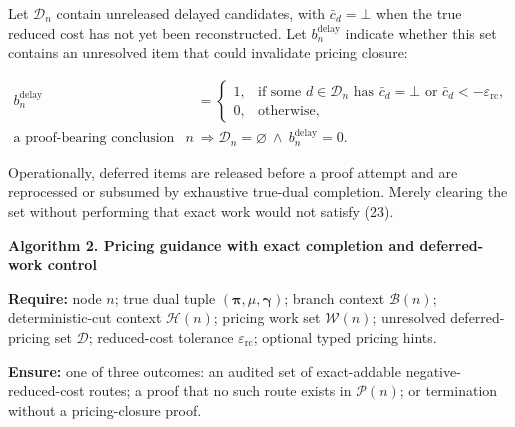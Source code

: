 \documentclass[
  11pt,
]{article}
\begin{document}
Let \(\mathcal{D}_n\) contain unreleased delayed candidates, with
\(\bar c_d=\bot\) when the true reduced cost has not yet been
reconstructed. Let \(b_n^{\mathrm{delay}}\) indicate whether this set
contains an unresolved item that could invalidate pricing closure:

\[
\begin{aligned}
b_n^{\mathrm{delay}}
&=
\begin{cases}
1, &
\text{if some }d\in\mathcal{D}_n
\text{ has }\bar c_d=\bot
\text{ or }\bar c_d<-\varepsilon_{\mathrm{rc}},\\
0, & \text{otherwise},
\end{cases}\\[2mm]
\text{a proof-bearing conclusion at node }n
&\Rightarrow
\mathcal{D}_n=\varnothing
\ \land\
b_n^{\mathrm{delay}}=0.
\end{aligned}
\tag{23}
\]

Operationally, deferred items are released before a proof attempt and
are reprocessed or subsumed by exhaustive true-dual completion. Merely
clearing the set without performing that exact work would not satisfy
(23).

\textbf{Algorithm 2. Pricing guidance with exact completion and
deferred-work control}

\textbf{Require:} node \(n\); true dual tuple
\((\boldsymbol{\pi},\mu,\boldsymbol{\gamma})\); branch context
\(\mathcal{B}(n)\); deterministic-cut context \(\mathcal{H}(n)\);
pricing work set \(\mathcal{W}(n)\); unresolved deferred-pricing set
\(\mathcal{D}\); reduced-cost tolerance \(\varepsilon_{\mathrm{rc}}\);
optional typed pricing hints.

\textbf{Ensure:} one of three outcomes: an audited set of exact-addable
negative-reduced-cost routes; a proof that no such route exists in
\(\mathcal{P}(n)\); or termination without a pricing-closure proof.
\end{document}
